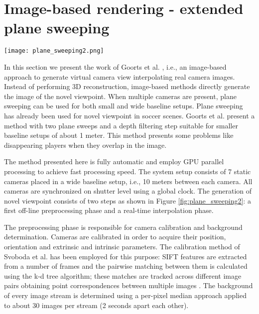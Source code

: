 \section{Image-based rendering - extended plane sweeping}


\begin{figure*}[htbp]
\centerline{\texttt{[image: plane\_sweeping2.png]}}
\caption{Overview of the extended plane sweeping method. Both the non real-time and real-time phase are shown \cite{05_plane_sweeping}.}
\label{fig:plane_sweeping2}
\end{figure*}

In this section we present the work of Goorts et al. \cite{05_plane_sweeping}, i.e., an image-based approach to generate 
virtual camera view interpolating real camera images.
Instead of performing 3D reconstruction, image-based methods directly generate the image of the novel viewpoint.
When multiple cameras are present, plane sweeping can be used \cite{05_plane_sweeping_yang} for both small and wide 
baseline setups.
Plane sweeping has already been used for novel viewpoint in soccer scenes. Goorts et al. \cite{05_plane_sweeping_2013} 
present a method with two plane sweeps and a depth filtering step suitable for smaller baseline 
setups of about 1 meter. 
This method presents some problems like disappearing players
when they overlap in the image.

The method presented here is fully automatic and employ GPU
parallel processing to achieve fast processing speed.
The system setup consists of 7 static cameras placed in a
wide baseline setup, i.e., 10 meters between each camera.
All cameras are synchronized on shutter level using a global clock.
The generation of novel viewpoint consists of two steps as shown in Figure \ref{fig:plane_sweeping2}:
a first off-line preprocessing phase and a real-time interpolation phase. 

The preprocessing phase is responsible for camera calibration and background determination.
Cameras are calibrated in order to acquire their position, orientation and extrinsic and intrinsic parameters.
The calibration method of Svoboda et al. \cite{05_plane_sweeping_Svoboda} has been employed for this purpose:
SIFT features are extracted from a number of frames and the pairwise matching between them is calculated 
using the k-d tree algorithm; these matches are tracked across different image pairs obtaining point 
correspondences between multiple images \cite{05_plane_sweeping}.
The background of every image stream is determined using a per-pixel median approach applied to about 30 images
per stream (2 seconds apart each other).


